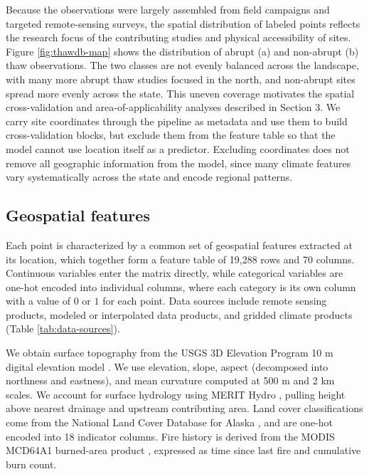 \documentclass[../main.tex]{subfiles}
\begin{document}
Because the observations were largely assembled from field campaigns and targeted remote-sensing surveys, the spatial distribution of labeled points reflects the research focus of the contributing studies and physical accessibility of sites. Figure \ref{fig:thawdb-map} shows the distribution of abrupt (a) and non-abrupt (b) thaw observations. The two classes are not evenly balanced across the landscape, with many more abrupt thaw studies focused in the north, and non-abrupt sites spread more evenly across the state. This uneven coverage motivates the spatial cross-validation and area-of-applicability analyses described in Section 3. We carry site coordinates through the pipeline as metadata and use them to build cross-validation blocks, but exclude them from the feature table so that the model cannot use location itself as a predictor. Excluding coordinates does not remove all geographic information from the model, since many climate features vary systematically across the state and encode regional patterns.

\subsection{Geospatial features}

Each point is characterized by a common set of geospatial features extracted at its location, which together form a feature table of 19,288 rows and 70 columns. Continuous variables enter the matrix directly, while categorical variables are one-hot encoded into individual columns, where each category is its own column with a value of $0$ or $1$ for each point. Data sources include remote sensing products, modeled or interpolated data products, and gridded climate products (Table \ref{tab:data-sources}).

We obtain surface topography from the USGS 3D Elevation Program 10 m digital elevation model \citep{usgs3dep}. We use elevation, slope, aspect (decomposed into northness and eastness), and mean curvature computed at 500 m and 2 km scales. We account for surface hydrology using MERIT Hydro \citep{yamazaki2019merit}, pulling height above nearest drainage and upstream contributing area. Land cover classifications come from the National Land Cover Database for Alaska \citep{dewitz2019national}, and are one-hot encoded into 18 indicator columns. Fire history is derived from the MODIS MCD64A1 burned-area product \citep{giglio2018collection}, expressed as time since last fire and cumulative burn count.
\end{document}
